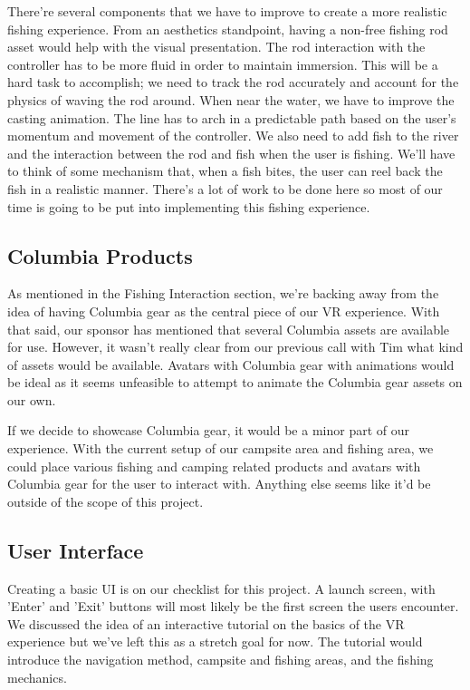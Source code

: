 \documentclass[10pt,journal,compsoc,onecolumn, draftclsnofoot]{IEEEtran}
\begin{document}
There're several components that we have to improve to create a more realistic fishing experience. From an aesthetics standpoint, having a non-free fishing rod asset would help with the visual presentation. The rod interaction with the controller has to be more fluid in order to maintain immersion. This will be a hard task to accomplish; we need to track the rod accurately and account for the physics of waving the rod around. When near the water, we have to improve the casting animation. The line has to arch in a predictable path based on the user's momentum and movement of the controller. We also need to add fish to the river and the interaction between the rod and fish when the user is fishing. We'll have to think of some mechanism that, when a fish bites, the user can reel back the fish in a realistic manner. There's a lot of work to be done here so most of our time is going to be put into implementing this fishing experience.

\subsection{Columbia Products}
As mentioned in the Fishing Interaction section, we're backing away from the idea of having Columbia gear as the central piece of our VR experience. With that said, our sponsor has mentioned that several Columbia assets are available for use. However, it wasn't really clear from our previous call with Tim what kind of assets would be available. Avatars with Columbia gear with animations would be ideal as it seems unfeasible to attempt to animate the Columbia gear assets on our own.

If we decide to showcase Columbia gear, it would be a minor part of our experience. With the current setup of our campsite area and fishing area, we could place various fishing and camping related products and avatars with Columbia gear for the user to interact with. Anything else seems like it'd be outside of the scope of this project.

\subsection{User Interface}
Creating a basic UI is on our checklist for this project. A launch screen, with 'Enter' and 'Exit' buttons will most likely be the first screen the users encounter. We discussed the idea of an interactive tutorial on the basics of the VR experience but we've left this as a stretch goal for now. The tutorial would introduce the navigation method, campsite and fishing areas, and the fishing mechanics.
\end{document}
